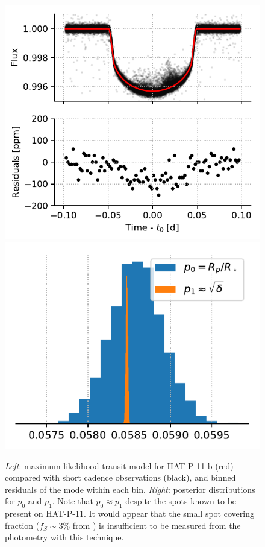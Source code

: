 \begin{figure}%
    \centering
    \includegraphics[scale=0.75]{robin/hat11_residuals_ld.pdf}
    \includegraphics[scale=0.75]{robin/hat11_agreement_ld_nomask.pdf}
    \caption{\textsl{Left}: maximum-likelihood transit model for HAT-P-11 b (red) compared with \kepler short cadence observations (black), and binned residuals of the mode within each bin. \textsl{Right}: posterior distributions for $p_0$ and $p_1$. Note that $p_0 \approx p_1$ despite the spots known to be present on HAT-P-11. It would appear that the small spot covering fraction ($f_S \sim 3\%$ from \citealt{Morris2017a}) is insufficient to be measured from the \kepler photometry with this technique.}
    \label{fig:hat11}
\end{figure}

